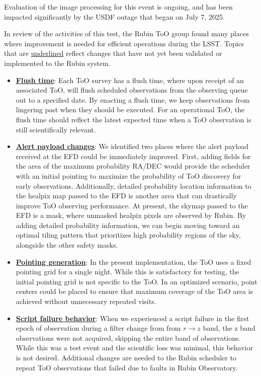 Evaluation of the image processing for this event is ongoing, and has been impacted significantly by the USDF outage that began on July 7, 2025.

In review of the activities of this test, the Rubin ToO group found many places where improvement is needed for efficient operations during the LSST. Topics that are \underline{underlined} reflect changes that have not yet been validated or implemented to the Rubin system.

\begin{itemize}
    \item \textbf{\underline{Flush time}}: Each ToO survey has a flush time, where upon receipt of an associated ToO, will flush scheduled observations from the observing queue out to a specified date. By enacting a flush time, we keep observations from lingering past when they should be executed. For an operational ToO, the flush time should reflect the latest expected time when a ToO observation is still scientifically relevant.
    \item \textbf{\underline{Alert payload changes}}: We identified two places where the alert payload received at the EFD could be immediately improved. First, adding fields for the area of the maximum probability RA/DEC would provide the scheduler with an initial pointing to maximize the probability of ToO discovery for early observations. Additionally, detailed probability location information to the healpix map passed to the EFD is another area that can drastically improve ToO observing performance. At present, the skymap passed to the EFD is a mask, where unmasked healpix pixels are observed by Rubin. By adding detailed probability information, we can begin moving toward an optimal tiling pattern that prioritizes high probability regions of the sky, alongside the other safety masks.
    \item \textbf{\underline{Pointing generation}}: In the present implementation, the ToO uses a fixed pointing grid for a single night. While this is satisfactory for testing, the initial pointing grid is not specific to the ToO. In an optimized scenario, point centers could be placed to ensure that maximum coverage of the ToO area is achieved without unnecessary repeated visits.
    \item \textbf{\underline{Script failure behavior}}: When we experienced a script failure in the first epoch of observation during a filter change from from $r\rightarrow z$ band, the z band observations were not acquired, skipping the entire band of observations. While this was a test event and the scientific loss was minimal, this behavior is not desired. Additional changes are needed to the Rubin scheduler to repeat ToO observations that failed due to faults in Rubin Observatory.

\end{itemize}
